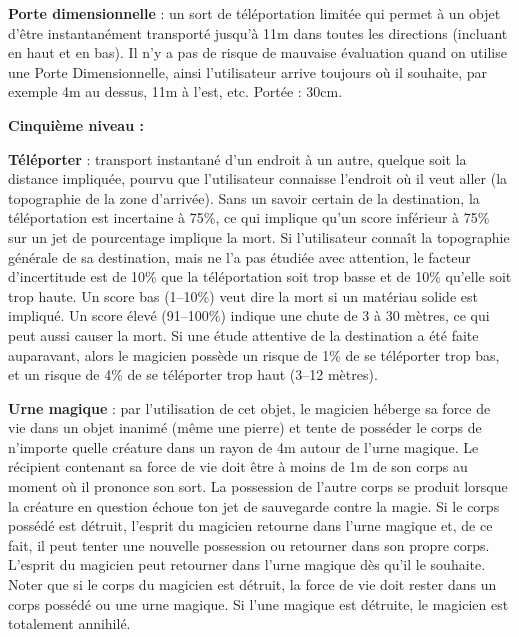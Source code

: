 \bigskip

\label{sort-porte-dimensionnelle}\textbf{Porte dimensionnelle} : un sort de téléportation limitée qui permet à un objet d'être instantanément transporté jusqu'à 11m dans toutes les directions (incluant en haut et en bas). Il n'y a pas de risque de mauvaise évaluation quand on utilise une Porte Dimensionnelle, ainsi l'utilisateur arrive toujours où il souhaite, par exemple 4m au dessus, 11m à l'est, etc. Portée : 30cm.

\bigskip

\textbf{Cinquième niveau :}

\bigskip

\label{sort-teleporter}\textbf{Téléporter} : transport instantané d'un endroit à un autre, quelque soit la distance impliquée, pourvu que l'utilisateur connaisse l'endroit où il veut aller (la topographie de la zone d'arrivée). Sans un savoir certain de la destination, la téléportation est incertaine à 75\%, ce qui implique qu'un score inférieur à 75\% sur un jet de pourcentage implique la mort. Si l'utilisateur connaît la topographie générale de sa destination, mais ne l'a pas étudiée avec attention, le facteur d'incertitude est de 10\% que la téléportation soit trop basse et de 10\% qu'elle soit trop haute. Un score bas (1--10\%) veut dire la mort si un matériau solide est impliqué. Un score élevé (91--100\%) indique une chute de 3 à 30 mètres, ce qui peut aussi causer la mort. Si une étude attentive de la destination a été faite auparavant, alors le magicien possède un risque de 1\% de se téléporter trop bas, et un risque de 4\% de se téléporter trop haut (3--12 mètres).

\bigskip

\label{sort-urne-magique}\textbf{Urne magique} : par l'utilisation de cet objet, le magicien héberge sa force de vie dans un objet inanimé (même une pierre) et tente de posséder le corps de n'importe quelle créature dans un rayon de 4m autour de l'urne magique. Le récipient contenant sa force de vie doit être à moins de 1m de son corps au moment où il prononce son sort. La possession de l'autre corps se produit lorsque la créature en question échoue ton jet de sauvegarde contre la magie. Si le corps possédé est détruit, l'esprit du magicien retourne dans l'urne magique et, de ce fait, il peut tenter une nouvelle possession ou retourner dans son propre corps. L'esprit du magicien peut retourner dans l'urne magique dès qu'il le souhaite. Noter que si le corps du magicien est détruit, la force de vie doit rester dans un corps possédé ou une urne magique. Si l'une magique est détruite, le magicien est totalement annihilé.

